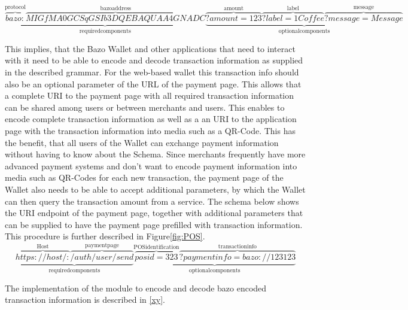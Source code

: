 \[
\underbrace{\overbrace{bazo:}^{\mathrm{protocol}}\overbrace{MIGfMA0GCSqGSIb3DQEBAQUAA4GNADC}^{\mathrm{bazo address}}}_{\mathrm{required components}}
\underbrace{\overbrace{?amount=123}^{\mathrm{amoun t}}\overbrace{?label=1 Coffee}^{\mathrm{label}}\overbrace{?message=Message}^{\mathrm{message}}}_{\mathrm{optional components}}
\]


This implies, that the Bazo Wallet and other applications that need to interact with it need to be able to encode and decode transaction information as supplied in the described grammar.
For the web-based wallet this transaction info should also be an optional parameter of the URL of the payment page. This allows that a complete URI to the payment page with all required transaction information can be shared among users or between merchants and users.
This enables to encode complete transaction information as well as a an URI to the application page with the transaction information into media such as a QR-Code. This has the benefit, that all users of the Wallet can exchange payment information without having to know about the Schema.
Since merchants frequently have more advanced payment systems and don't want to encode payment information into media such as QR-Codes for each new transaction, the payment page of the Wallet also needs to be able to accept additional parameters, by which the Wallet can then query the transaction amount from a service.
The schema below shows the URI endpoint of the payment page, together with additional parameters that can be supplied to have the payment page prefilled with transaction information. This procedure is further described in Figure\ref{fig:POS}.
\[
\underbrace{\overbrace{https://host/:}^{\mathrm{Host}}\overbrace{/auth/user/send}^{\mathrm{payment page}}}_{\mathrm{required components}}
\underbrace{\overbrace{posid=323}^{\mathrm{POS identification}}\overbrace{?paymentinfo=bazo://123123}^{\mathrm{transaction info}}}_{\mathrm{optional components}}
\]

The implementation of the module to encode and decode bazo encoded transaction information is described in \ref{xy}.

